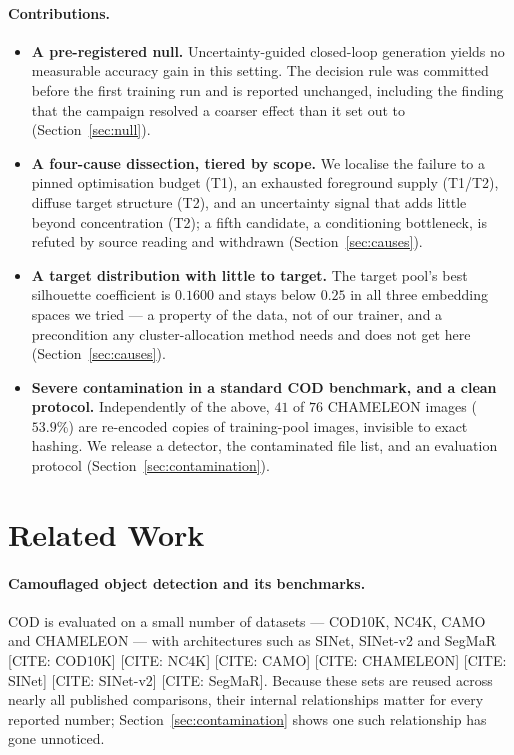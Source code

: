 \documentclass{article}
\begin{document}
\paragraph{Contributions.}
\begin{itemize}
\item \textbf{A pre-registered null.} Uncertainty-guided closed-loop generation
      yields no measurable accuracy gain in this setting. The decision rule was
      committed before the first training run and is reported unchanged,
      including the finding that the campaign resolved a coarser effect than it
      set out to (Section~\ref{sec:null}).
\item \textbf{A four-cause dissection, tiered by scope.} We localise the failure
      to a pinned optimisation budget (T1), an exhausted foreground supply
      (T1/T2), diffuse target structure (T2), and an uncertainty signal that
      adds little beyond concentration (T2); a fifth candidate, a conditioning
      bottleneck, is refuted by source reading and withdrawn
      (Section~\ref{sec:causes}).
\item \textbf{A target distribution with little to target.} The target pool's
      best silhouette coefficient is $0.1600$ and stays below $0.25$ in all
      three embedding spaces we tried --- a property of the data, not of our
      trainer, and a precondition any cluster-allocation method needs and does
      not get here (Section~\ref{sec:causes}).
\item \textbf{Severe contamination in a standard COD benchmark, and a clean
      protocol.} Independently of the above, $41$ of $76$ CHAMELEON images
      ($53.9\%$) are re-encoded copies of training-pool images, invisible to
      exact hashing. We release a detector, the contaminated file list, and an
      evaluation protocol (Section~\ref{sec:contamination}).
\end{itemize}

\section{Related Work}
\label{sec:related}

\paragraph{Camouflaged object detection and its benchmarks.}
COD is evaluated on a small number of datasets --- COD10K, NC4K, CAMO and
CHAMELEON --- with architectures such as SINet, SINet-v2 and SegMaR
[CITE: COD10K] [CITE: NC4K] [CITE: CAMO] [CITE: CHAMELEON] [CITE: SINet]
[CITE: SINet-v2] [CITE: SegMaR]. Because these sets are reused across nearly all
published comparisons, their internal relationships matter for every reported
number; Section~\ref{sec:contamination} shows one such relationship has gone
unnoticed.
\end{document}
